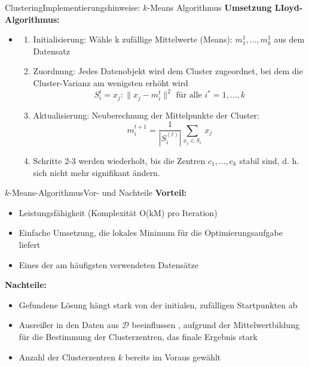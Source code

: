 \documentclass[169, handout	]{THIbeamer} %
\begin{document}
	\begin{frame}{Clustering}{Implementierungshinweise: $k$-Means Algorithmus}
		\textbf{Umsetzung LIoyd-Algorithmus:}
		\begin{itemize}
			\item 
			\begin{enumerate}
				\item Initialisierung: Wähle k zufällige Mittelwerte (Means): $m_1^{1},...,m_k^{1}$ aus dem Datensatz
				\item Zuordnung: Jedes Datenobjekt wird dem Cluster zugeordnet, bei dem die Cluster-Varianz am wenigsten erhöht wird
				\begin{equation}
					S_i^{t} = { x_j : \lVert x_j - m_i^{t} \rVert ^2 \text{ für alle } i^{*}=1, ..., k}
				\end{equation}
				\item Aktualisierung: Neuberechnung der Mittelpunkte der Cluster:
				\begin{equation}
					m_i^{t+1} = \frac{1}{|S_i^{(t)}|} \sum_{x_j \in S_i}^{}\ x_j
				\end{equation}
				\item Schritte 2-3 werden wiederholt, bis die Zentren $c_1, ..., c_k$ stabil sind, d. h. sich nicht mehr signifikant ändern.
			\end{enumerate}

		\end{itemize}
	\end{frame}
	\begin{frame}{$k$-Means-Algorithmus}{Vor- und Nachteile}
		\textbf{Vorteil:} 
		\begin{itemize}
			\item Leistungsfähigkeit (Komplexität O(kM) pro Iteration)
			\item Einfache Umsetzung, die lokales Minimum für die Optimierungsaufgabe liefert
			\item Eines der am häufigsten verwendeten Datensätze
		\end{itemize} 		
		\textbf{Nachteile:}		
		\begin{itemize}
			\item Gefundene Lösung hängt stark von der initialen, zufälligen Startpunkten ab
			\item Ausreißer in den Daten aus $\mathcal{D}$ beeinflussen , aufgrund der Mittelwertbildung für die Bestimmung der Clusterzentren, das finale Ergebnis stark
			\item Anzahl der Clusterzentren $k$ bereits im Voraus gewählt
		\end{itemize}
	\end{frame}
\end{document}
